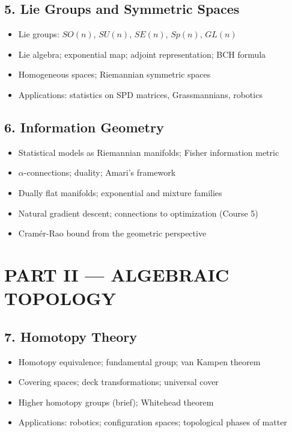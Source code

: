 \subsection{5. Lie Groups and Symmetric Spaces}
\begin{itemize}
\item Lie groups: $SO(n)$, $SU(n)$, $SE(n)$, $Sp(n)$, $GL(n)$
\item Lie algebra; exponential map; adjoint representation; BCH formula
\item Homogeneous spaces; Riemannian symmetric spaces
\item Applications: statistics on SPD matrices, Grassmannians, robotics
\end{itemize}

\subsection{6. Information Geometry}
\begin{itemize}
\item Statistical models as Riemannian manifolds; Fisher information metric
\item $\alpha$-connections; duality; Amari's framework
\item Dually flat manifolds; exponential and mixture families
\item Natural gradient descent; connections to optimization (Course 5)
\item Cram\'er-Rao bound from the geometric perspective
\end{itemize}

\section{PART II --- ALGEBRAIC TOPOLOGY}

\subsection{7. Homotopy Theory}
\begin{itemize}
\item Homotopy equivalence; fundamental group; van Kampen theorem
\item Covering spaces; deck transformations; universal cover
\item Higher homotopy groups (brief); Whitehead theorem
\item Applications: robotics; configuration spaces; topological phases of matter
\end{itemize}

